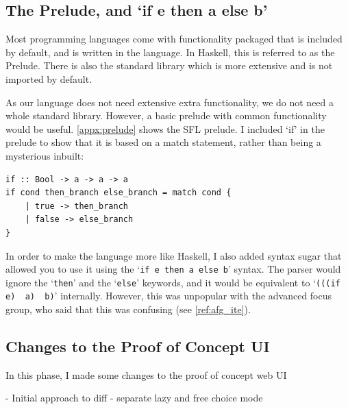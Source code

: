 \subsection{The Prelude, and `if e then a else b'}
Most programming languages come with functionality packaged that is included by default, and is written in the language. In Haskell, this is referred to as the Prelude. There is also the standard library which is more extensive and is not imported by default. 

As our language does not need extensive extra functionality, we do not need a whole standard library. However, a basic prelude with common functionality would be useful. \ref{appx:prelude} shows the SFL prelude. I included `if' in the prelude to show that it is based on a match statement, rather than being a mysterious inbuilt: 

\begin{lstlisting}[language=SFL]
if :: Bool -> a -> a -> a
if cond then_branch else_branch = match cond {
    | true -> then_branch
    | false -> else_branch
}    
\end{lstlisting}

In order to make the language more like Haskell, I also added syntax sugar that allowed you to use it using the `\lstinline[language=SFL_ite]|if e then a else b|' syntax. The parser would ignore the `\lstinline[language=SFL_ite]|then|' and the `\lstinline[language=SFL_ite]|else|' keywords, and it would be equivalent to `\lstinline[language=SFL_ite]|(((if e)  a)  b)|' internally. However, this was unpopular with the advanced focus group, who said that this was confusing (see \ref{ref:afg_ite}). 

\subsection{Changes to the Proof of Concept UI}
\label{c2_poc_ui_impl}
In this phase, I made some changes to the proof of concept web UI

- Initial approach to diff
- separate lazy and free choice mode

